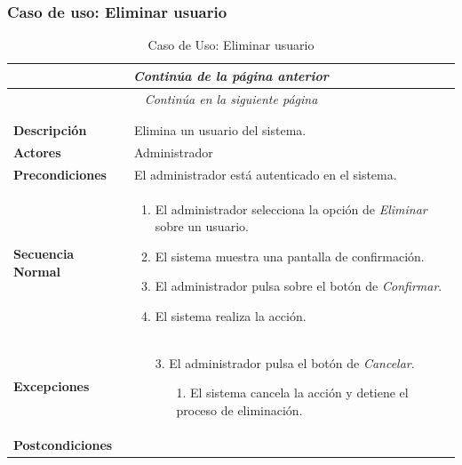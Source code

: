 


\newpage
\subsubsection*{Caso de uso: Eliminar usuario }
\begin{longtable}{| p{4cm} | p{10cm} |}
\endfirsthead
\multicolumn{2}{c}{\textit{Continúa de la página anterior}}\\[12pt]
\hline
\endhead
\hline
\multicolumn{2}{c}{\textit{Continúa en la siguiente página}} \\
\endfoot
\hline
\caption{Caso de Uso: Eliminar usuario}\label{fig:1}\\
\endlastfoot


\hline
\multicolumn{2}{|c|}{\textbf{CU$<$25$>$ - Eliminar Usuario}} \\

\hline
\textbf{Descripción} &
Elimina un usuario del sistema.\\

\hline
\textbf{Actores} &
Administrador\\

\hline
\textbf{Precondiciones} &
El administrador está autenticado en el sistema.\\

\hline
\textbf{Secuencia Normal} &\mbox{}\par\vspace{-\baselineskip}
\begin{enumerate}[leftmargin=0.7cm, topsep=0.1cm]
\item El administrador selecciona la opción de \textit{Eliminar} sobre un usuario.
\item El sistema muestra una pantalla de confirmación.
\item El administrador pulsa sobre el botón de \textit{Confirmar}.
\item El sistema realiza la acción.
\end{enumerate}


\\
\hline
\textbf{Excepciones} &\mbox{}\par\vspace{-\baselineskip}
\begin{enumerate}[leftmargin=0.9cm, topsep=0.1cm]
\item[3.] El administrador pulsa el botón de \textit{Cancelar}.
	\begin{itemize}
	\item[1.] El sistema cancela la acción y detiene el proceso de eliminación.
	\end{itemize}
\end{enumerate}
\\

\hline
\textbf{Postcondiciones} & \\
\hline
\end{longtable}




